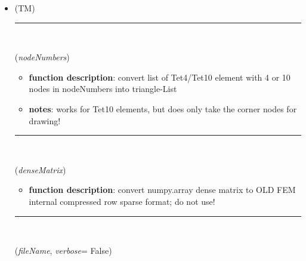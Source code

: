 \begin{itemize}[leftmargin=1.4cm]
\begin{itemize}[leftmargin=1.4cm]
\begin{itemize}[leftmargin=1.4cm]
\begin{itemize}[leftmargin=0.5cm]
\begin{itemize}[leftmargin=1.4cm]
\begin{itemize}[leftmargin=1.4cm]
\begin{itemize}[leftmargin=1.4cm]
\begin{itemize}[leftmargin=0.5cm]
%
%
\noindent For examples on ConvertHexToTrigs see Relevant Examples (Ex) and TestModels (TM) with weblink to github:
\bi
 \item \footnotesize {} (TM)
\ei

%
\noindent\rule{8cm}{0.75pt}\vspace{1pt} \\ 
\begin{flushleft}
\label{sec:FEM:ConvertTetToTrigs}
({\it nodeNumbers})
\end{flushleft}
\setlength{\itemindent}{0.7cm}
\begin{itemize}[leftmargin=0.7cm]
\item[--]
{\bf function description}: convert list of Tet4/Tet10 element with 4 or 10 nodes in nodeNumbers into triangle-List
\item[--]
{\bf notes}: works for Tet10 elements, but does only take the corner nodes for drawing!
\vspace{12pt}\end{itemize}
%
\noindent\rule{8cm}{0.75pt}\vspace{1pt} \\ 
\begin{flushleft}
\label{sec:FEM:ConvertDenseToCompressedRowMatrix}
({\it denseMatrix})
\end{flushleft}
\setlength{\itemindent}{0.7cm}
\begin{itemize}[leftmargin=0.7cm]
\item[--]
{\bf function description}: convert numpy.array dense matrix to OLD FEM internal compressed row sparse format; do not use!
\vspace{12pt}\end{itemize}
%
\noindent\rule{8cm}{0.75pt}\vspace{1pt} \\ 
\begin{flushleft}
\label{sec:FEM:ReadMatrixFromAnsysMMF}
({\it fileName}, {\it verbose}= False)
\end{flushleft}
\setlength{\itemindent}{0.7cm}

\end{itemize}
\end{itemize}
\end{itemize}
\end{itemize}
\end{itemize}
\end{itemize}
\end{itemize}
\end{itemize}
